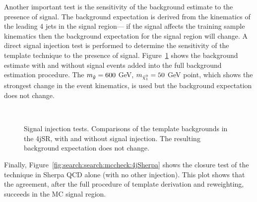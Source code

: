 Another important test is the sensitivity of the background estimate to the presence of signal. The background expectation is derived from the kinematics of the leading 4 jets in the signal region--- if the signal affects the training sample kinematics then the background expectation for the signal region will change. A direct signal injection test is performed to determine the sensitivity of the template technique to the presence of signal. Figure~\ref{fig:search:search:mccheck:4jSignalInjection} shows the \Sherpa background estimate with and without signal events added into the full background estimation procedure. The $m_{\tilde{g}} = 600$ GeV, $\mninoone = 50$ GeV point, which shows the strongest change in the event kinematics, is used but the background expectation does not change.

\begin{figure}[!ht]
  \centering
  
  \\
    
  \caption{Signal injection tests. Comparisons of the template backgrounds in the 4jSR, with and without signal injection. The resulting background expectation does not change.}
               
  \label{fig:search:search:mccheck:4jSignalInjection}
\end{figure}

Finally, Figure~\ref{fig:search:search:mccheck:4jSherpa} shows the closure test of the technique in Sherpa QCD alone (with no other injection). This plot shows that the agreement, after the full procedure of template derivation and reweighting, succeeds in the MC signal region. 

